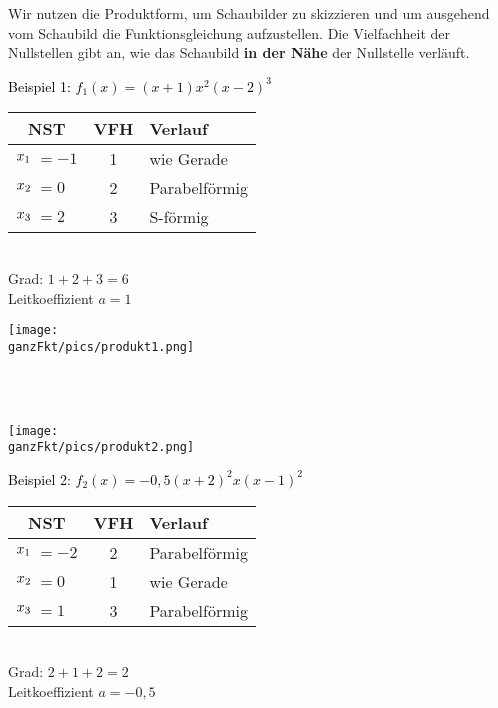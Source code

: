 \newpage
Wir nutzen die Produktform, um Schaubilder zu skizzieren und um ausgehend vom Schaubild die Funktionsgleichung aufzustellen. Die Vielfachheit der Nullstellen gibt an, wie das Schaubild \textbf{in der Nähe} der Nullstelle verläuft.\vspace{0.15cm}\\
\begin{minipage}{\linewidth}
	{\color{loes}\begin{minipage}{0.5\linewidth}
			\textcolor{black}{Beispiel 1: \(f_1(x)=(x+1)x^2(x-2)^3\)}\\
			\begin{tabular}{rlcl}
				\multicolumn{2}{c}{NST}&VFH&Verlauf\\
				\midrule
				\(x_1\hspace{-0.3cm}\)&\(=-1\)&1&wie Gerade\\
				\(x_2\hspace{-0.3cm}\)&\(=0\)&2&Parabelförmig\\
				\(x_3\hspace{-0.3cm}\)&\(=2\)&3&S-förmig
			\end{tabular}\\
			Grad: \(1+2+3=6\)\\
			Leitkoeffizient \(a=1\)\\
	\end{minipage}}
	\begin{minipage}{0.5\linewidth}
		\texttt{[image: \\ganzFkt/pics/produkt1.png]}
	\end{minipage}
\end{minipage}\\ \vspace{.15cm}\\
\begin{minipage}{\linewidth}
	\begin{minipage}{0.5\linewidth}
		\texttt{[image: \\ganzFkt/pics/produkt2.png]}
	\end{minipage}
	{\color{loes}\begin{minipage}{0.5\linewidth}
			\textcolor{black}{Beispiel 2: \(f_2(x)=-0,5(x+2)^2x(x-1)^2\)}\\
			\begin{tabular}{rlcl}
				\multicolumn{2}{c}{NST}&VFH&Verlauf\\
				\midrule
				\(x_1\hspace{-0.3cm}\)&\(=-2\)&2&Parabelförmig\\
				\(x_2\hspace{-0.3cm}\)&\(=0\)&1&wie Gerade\\
				\(x_3\hspace{-0.3cm}\)&\(=1\)&3&Parabelförmig
			\end{tabular}\\
			Grad: \(2+1+2=2\)\\
			Leitkoeffizient \(a=-0,5\)\\
	\end{minipage}}
\end{minipage}\\ \vspace{.15cm}\\
